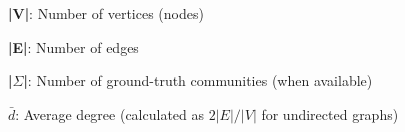 \documentclass[tikz,crop,convert={density=400,outext=.png}]{standalone}
\begin{document}
\begin{table}
\robustify\bfseries
\caption{Statistics of SNAP datasets used in evaluation}
\centering

\begin{tablenotes}
\small
\item \textbf{|V|}: Number of vertices (nodes)
\item \textbf{|E|}: Number of edges  
\item \textbf{|$\Sigma$|}: Number of ground-truth communities (when available)
\item \textbf{$\bar{d}$}: Average degree (calculated as $2|E|/|V|$ for undirected graphs)
\end{tablenotes}
\label{tab:snap_datasets}
\end{table}
\end{document}
